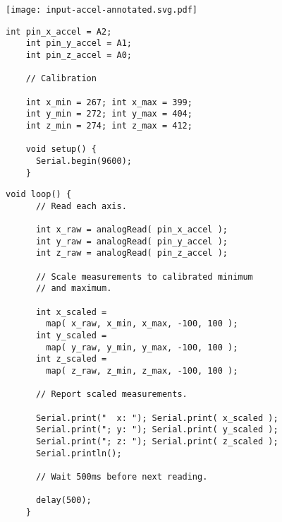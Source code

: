 \vspace{0.1in}
\begin{minipage}[t]{0.49\tw}

  \vspace{0.0in}
  \texttt{[image: input-accel-annotated.svg.pdf]}

  \vspace{0.0in}
  \begin{Verbatim}[gobble=3,fontsize=\small]
    int pin_x_accel = A2;
    int pin_y_accel = A1;
    int pin_z_accel = A0;

    // Calibration

    int x_min = 267; int x_max = 399;
    int y_min = 272; int y_max = 404;
    int z_min = 274; int z_max = 412;

    void setup() {
      Serial.begin(9600);
    }
  \end{Verbatim}
\end{minipage}
\hfill
\begin{minipage}[t]{0.49\tw}
  \vspace{0.0in}
  \begin{Verbatim}[gobble=3,fontsize=\small]
    void loop() {
      // Read each axis.

      int x_raw = analogRead( pin_x_accel );
      int y_raw = analogRead( pin_y_accel );
      int z_raw = analogRead( pin_z_accel );

      // Scale measurements to calibrated minimum
      // and maximum.

      int x_scaled =
        map( x_raw, x_min, x_max, -100, 100 );
      int y_scaled =
        map( y_raw, y_min, y_max, -100, 100 );
      int z_scaled =
        map( z_raw, z_min, z_max, -100, 100 );

      // Report scaled measurements.

      Serial.print("  x: "); Serial.print( x_scaled );
      Serial.print("; y: "); Serial.print( y_scaled );
      Serial.print("; z: "); Serial.print( z_scaled );
      Serial.println();

      // Wait 500ms before next reading.

      delay(500);
    }
  \end{Verbatim}
\end{minipage}
\vspace{0.1in}

